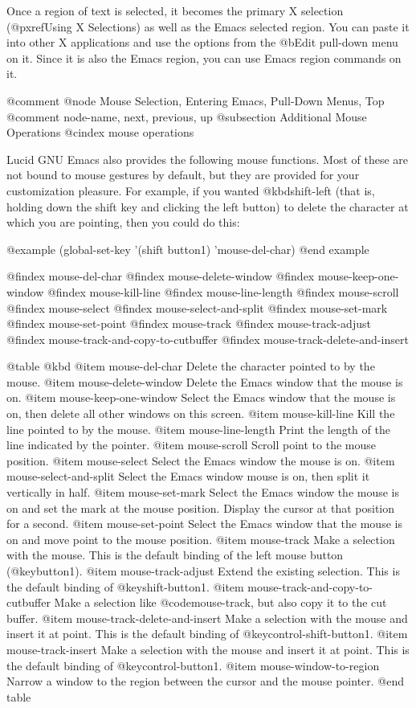 {{{  Once a region of text is selected, it becomes the primary X selection
(@pxref{Using X Selections}) as well as the Emacs selected region. You
can paste it into other X applications and use the options from the
@b{Edit} pull-down menu on it.  Since it is also the Emacs region, you
can use Emacs region commands on it.

@comment @node Mouse Selection, Entering Emacs, Pull-Down Menus, Top
@comment  node-name,  next,  previous,  up
@subsection Additional Mouse Operations
@cindex mouse operations

Lucid GNU Emacs also provides the following mouse functions.
Most of these are not bound to mouse gestures by default, but they are
provided for your customization pleasure.  For example, if you
wanted @kbd{shift-left} (that is, holding down the shift key
and clicking the left button) to delete the character at which
you are pointing, then you could do this:

@example
(global-set-key '(shift button1) 'mouse-del-char)
@end example

@findex mouse-del-char
@findex mouse-delete-window
@findex mouse-keep-one-window
@findex mouse-kill-line
@findex mouse-line-length
@findex mouse-scroll
@findex mouse-select
@findex mouse-select-and-split
@findex mouse-set-mark
@findex mouse-set-point
@findex mouse-track
@findex mouse-track-adjust
@findex mouse-track-and-copy-to-cutbuffer
@findex mouse-track-delete-and-insert

@table @kbd
@item mouse-del-char
Delete the character pointed to by the mouse.
@item mouse-delete-window
Delete the Emacs window that the mouse is on.
@item mouse-keep-one-window
Select the Emacs window that the mouse is on, then delete all other
windows on this screen.
@item mouse-kill-line
Kill the line pointed to by the mouse.
@item mouse-line-length
Print the length of the line indicated by the pointer.
@item mouse-scroll
Scroll point to the mouse position.
@item mouse-select
Select the Emacs window the mouse is on.
@item mouse-select-and-split
Select the Emacs window mouse is on, then split it vertically in half.
@item mouse-set-mark
Select the Emacs window the mouse is on and set the mark at the mouse 
position.  Display the cursor at that position for a second.
@item mouse-set-point
Select the Emacs window that the mouse is on and move point to the
mouse position.
@item mouse-track
Make a selection with the mouse.   This is the default binding of 
the left mouse button (@key{button1}).
@item mouse-track-adjust
Extend the existing selection.  This is the default binding of
@key{shift-button1}.
@item mouse-track-and-copy-to-cutbuffer
Make a selection like @code{mouse-track}, but also copy it to the cut buffer.
@item mouse-track-delete-and-insert
Make a selection with the mouse and insert it at point.  This is the
default binding of @key{control-shift-button1}.
@item mouse-track-insert
Make a selection with the mouse and insert it at point.
This is the default binding of @key{control-button1}.
@item mouse-window-to-region
Narrow a window to the region between the cursor and the mouse pointer.
@end table

}}}
